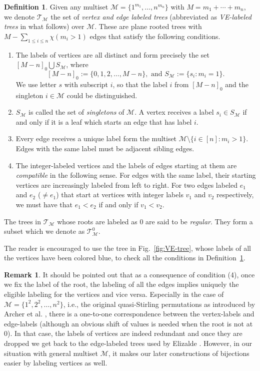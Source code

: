 \documentclass[11pt,reqno]{amsart}
\numberwithin{equation}{section}
\theoremstyle{plain}
\theoremstyle{definition}
\newtheorem{Def}[theorem]{Definition}
\newtheorem{remark}{Remark}
\newcommand{\M}{\mathcal{M}}
\newcommand{\T}{\mathcal{T}}
\begin{document}
\begin{Def}\label{def:VE-tree}
Given any multiset $\M=\{1^{m_1},\ldots,n^{m_n}\}$ with $M=m_1+\cdots+m_n$, we denote $\T_{\M}$ the set of {\em vertex and edge labeled trees} (abbreviated as {\em VE-labeled trees} in what follows) over $\M$. These are plane rooted trees with $M-\sum_{1\le i\le n}\chi(m_i>1)$ edges that satisfy the following conditions.
\begin{enumerate}
	\item The labels of vertices are all distinct and form precisely the set $[M-n]_0\bigcup S_{\M}$, where $$[M-n]_0:=\{0,1,2,\ldots,M-n\}, \text{ and } S_{\M}:=\{s_i:m_i=1\}.$$
	We use letter $s$ with subscript $i$, so that the label $i$ from $[M-n]_0$ and the singleton $i\in\M$ could be distinguished.
	\item $S_{\M}$ is called the set of {\em singletons} of $\M$. A vertex receives a label $s_i\in S_{\M}$ if and only if it is a leaf which starts an edge that has label $i$.
	\item Every edge receives a unique label form the multiset $\M\setminus\{i\in [n]:m_i>1\}$. Edges with the same label must be adjacent sibling edges.
	\item The integer-labeled vertices and the labels of edges starting at them are {\em compatible} in the following sense. For edges with the same label, their starting vertices are increasingly labeled from left to right. For two edges labeled $e_1$ and $e_2$ ($\neq e_1$) that start at vertices with integer labels $v_1$ and $v_2$ respectively, we must have that $e_1<e_2$ if and only if $v_1<v_2$.
\end{enumerate}
The trees in $\T_{\M}$ whose roots are labeled as $0$ are said to be {\em regular}. They form a subset which we denote as $\T_{\M}^0$.
\end{Def}

The reader is encouraged to use the tree in Fig.~\ref{fig:VE-tree}, whose labels of all the vertices have been colored blue, to check all the conditions in Definition~\ref{def:VE-tree}.

\begin{remark}\label{rmk:conversion}
It should be pointed out that as a consequence of condition (4), once we fix the label of the root, the labeling of all the edges implies uniquely the eligible labeling for the vertices and vice versa. Especially in the case of $\M=\{1^2,2^2,\ldots,n^2\}$, i.e., the original quasi-Stirling permutations as introduced by Archer et al. \cite{AGPS}, there is a one-to-one correspondence between the vertex-labels and edge-labels (although an obvious shift of values is needed when the root is not at $0$). In that case, the labels of vertices are indeed redundant and once they are dropped we get back to the edge-labeled trees used by Elizalde \cite{Eli}. However, in our situation with general multiset $\M$, it makes our later constructions of bijections easier by labeling vertices as well. 
\end{remark}
\end{document}
